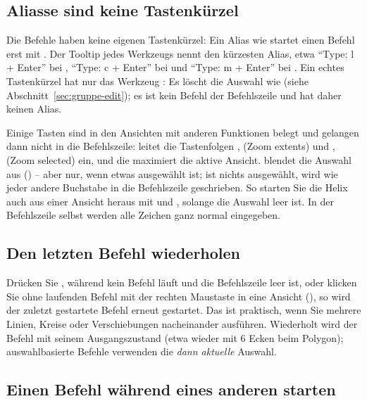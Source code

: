 \subsection{Aliasse sind keine Tastenkürzel}

Die Befehle haben keine eigenen Tastenkürzel: Ein Alias wie  startet einen Befehl erst
mit . Der Tooltip jedes Werkzeugs nennt den kürzesten Alias, etwa \enquote{Type: l +
Enter} bei , \enquote{Type: c + Enter} bei  und
\enquote{Type: m + Enter} bei . Ein echtes Tastenkürzel hat nur das Werkzeug
: Es löscht die Auswahl wie  (siehe Abschnitt~\ref{sec:gruppe-edit}); es
ist kein Befehl der Befehlszeile und hat daher keinen Alias.

\begin{hinweis}
Einige Tasten sind in den Ansichten mit anderen Funktionen belegt und gelangen dann nicht in
die Befehlszeile:  leitet die Tastenfolgen ,  (Zoom extents) und
,  (Zoom selected) ein, und die  maximiert die aktive Ansicht.
 blendet die Auswahl aus () -- aber nur, wenn etwas ausgewählt ist; ist
nichts ausgewählt, wird  wie jeder andere Buchstabe in die Befehlszeile geschrieben.
So starten Sie die Helix auch aus einer Ansicht heraus mit  und , solange
die Auswahl leer ist. In der Befehlszeile selbst werden alle Zeichen ganz normal eingegeben.
\end{hinweis}

\subsection{Den letzten Befehl wiederholen}

Drücken Sie , während kein Befehl läuft und die Befehlszeile leer ist, oder klicken
Sie ohne laufenden Befehl mit der rechten Maustaste in eine Ansicht (), so wird der zuletzt gestartete Befehl erneut gestartet. Das ist praktisch, wenn Sie mehrere Linien,
Kreise oder Verschiebungen nacheinander ausführen. Wiederholt wird der Befehl mit seinem
Ausgangszustand (etwa wieder mit 6 Ecken beim Polygon); auswahlbasierte Befehle verwenden die
\emph{dann aktuelle} Auswahl.

\subsection{Einen Befehl während eines anderen starten}

